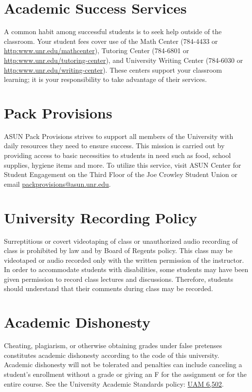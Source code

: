 \documentclass[11pt,onecolumn]{article}
\begin{document}
\section*{Academic Success Services}
A common habit among successful students is to seek help outside of the classroom. Your student fees cover use of the Math Center (784-4433 or \url{http:www.unr.edu/mathcenter}), Tutoring Center (784-6801 or \url{http:www.unr.edu/tutoring-center}), and University Writing Center (784-6030 or \url{http:www.unr.edu/writing-center}). These centers support your classroom learning; it is your responsibility to take advantage of their services.

\section*{Pack Provisions}
ASUN Pack Provisions strives to support all members of the University with daily resources they need to ensure success. This mission is carried out by providing access to basic necessities to students in need such as food, school supplies, hygiene items and more. To utilize this service, visit ASUN Center for Student Engagement on the Third Floor of the Joe Crowley Student Union or email \href{mailto:packprovisions@asun.unr.edu}{packprovisions@asun.unr.edu}.

\section*{University Recording Policy}
Surreptitious or covert videotaping of class or unauthorized audio recording of class is prohibited by law and by Board of Regents policy. This class may be videotaped or audio recorded only with the written permission of the instructor. In order to accommodate students with disabilities, some students may have been given permission to record class lectures and discussions. Therefore, students should understand that their comments during class may be recorded.

\section*{Academic Dishonesty}
Cheating, plagiarism, or otherwise obtaining grades under false pretenses constitutes academic dishonesty according to the code of this university. Academic dishonesty will not be tolerated and penalties can include canceling a student’s enrollment without a grade or giving an F for the assignment or for the entire course. See the University Academic Standards policy: \href{https://www.unr.edu/administrative-manual/6000-6999-curricula-teaching-research/instruction-research-procedures/6502-academic-standards}{UAM 6,502}.
\end{document}
